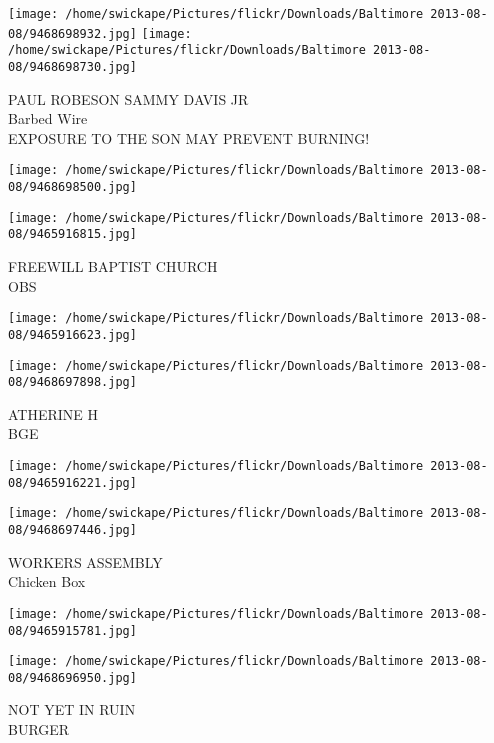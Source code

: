 \documentclass[10pt,letterpaper]{article}
\begin{document}
\vspace{0.25in}
\texttt{[image: /home/swickape/Pictures/flickr/Downloads/Baltimore 2013-08-08/9468698932.jpg]}
\texttt{[image: /home/swickape/Pictures/flickr/Downloads/Baltimore 2013-08-08/9468698730.jpg]}

PAUL ROBESON SAMMY DAVIS JR\\
Barbed Wire\\
EXPOSURE TO THE SON MAY PREVENT BURNING!\\
\pagebreak

\texttt{[image: /home/swickape/Pictures/flickr/Downloads/Baltimore 2013-08-08/9468698500.jpg]}

\vspace{0.25in}
\texttt{[image: /home/swickape/Pictures/flickr/Downloads/Baltimore 2013-08-08/9465916815.jpg]}

FREEWILL BAPTIST CHURCH\\
OBS\\
\pagebreak

\texttt{[image: /home/swickape/Pictures/flickr/Downloads/Baltimore 2013-08-08/9465916623.jpg]}

\vspace{0.25in}
\texttt{[image: /home/swickape/Pictures/flickr/Downloads/Baltimore 2013-08-08/9468697898.jpg]}

ATHERINE H\\
BGE\\
\pagebreak

\texttt{[image: /home/swickape/Pictures/flickr/Downloads/Baltimore 2013-08-08/9465916221.jpg]}

\vspace{0.25in}
\texttt{[image: /home/swickape/Pictures/flickr/Downloads/Baltimore 2013-08-08/9468697446.jpg]}

WORKERS ASSEMBLY\\
Chicken Box\\
\pagebreak

\texttt{[image: /home/swickape/Pictures/flickr/Downloads/Baltimore 2013-08-08/9465915781.jpg]}

\vspace{0.25in}
\texttt{[image: /home/swickape/Pictures/flickr/Downloads/Baltimore 2013-08-08/9468696950.jpg]}

NOT YET IN RUIN\\
BURGER\\
\pagebreak
\end{document}
